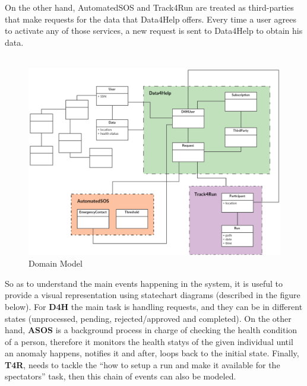 \documentclass[12pt]{report}
\begin{document}
 On the other hand, AutomatedSOS and Track4Run are treated as third-parties that make requests for the data that Data4Help offers. Every time a user agrees to activate any of those services, a new request is sent to Data4Help to obtain his data. \\\\

 \begin{figure}[H]
\centering
 \includegraphics[scale=0.45]{Diagrams/domain_model.png}
\caption[Domain Model]{Domain Model}
\label{fig:Domain_model}
\end{figure}

So as to understand the main events happening in the system, it is useful to provide a visual representation using statechart diagrams (described in the figure below). For \textbf {D4H} the main task is handling requests, and they can be in different states (unprocessed, pending, rejected/approved and completed). On the other hand, \textbf {ASOS} is a background process in charge of checking the health condition of a person, therefore it monitors the health statys of the given individual until an anomaly happens, notifies it and after, loops back to the initial state. Finally, \textbf {T4R}, needs to tackle the “how to setup a run and make it available for the spectators” task, then this chain of events can also be modeled.
\end{document}
